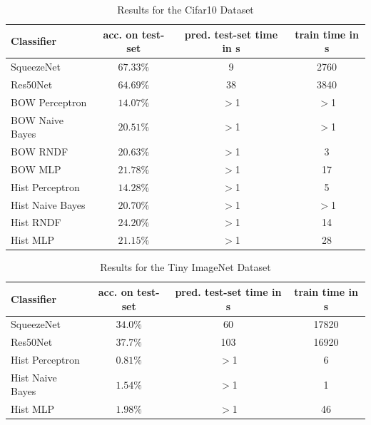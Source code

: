 \documentclass[11pt]{article}
\begin{document}
\begin{table}
	\centering
	\begin{tabular}{l|c|c|c}
	\toprule
		Classifier        & acc. on test-set  & pred. test-set time in s & train time in s\\
	\midrule
		SqueezeNet 		  & $67.33\%$         & 9 						 & 2760\\
		Res50Net   		  & $64.69\%$         & 38 						 & 3840\\
		BOW Perceptron    & $14.07\%$         & $>$1 					 & $>$1\\
		BOW Naive Bayes   & $20.51\%$         & $>$1 					 & $>$1\\
		BOW RNDF  		  & $20.63\%$         & $>$1 					 & 3   \\
		BOW MLP  		  & $21.78\%$         & $>$1 					 & 17  \\
		Hist Perceptron   & $14.28\%$         & $>$1 					 & 5   \\
		Hist Naive Bayes  & $20.70\%$         & $>$1 					 & $>$1\\
		Hist RNDF         & $24.20\%$         & $>$1 					 & 14  \\
		Hist MLP          & $21.15\%$         & $>$1 					 & 28  \\
	\bottomrule
	\end{tabular}
	\caption{Results for the Cifar10 Dataset}
\label{conc::1}
\end{table}


\begin{table}
	\centering
	\begin{tabular}{l|c|c|c}
	\toprule
		Classifier & acc. on test-set & pred. test-set time in s & train time in s\\
	\midrule
		SqueezeNet 		  & $34.0\%$           & 60 						 & 17820\\
		Res50Net   		  & $37.7\%$           & 103 					     & 16920\\
		Hist Perceptron   & $0.81\%$         & $>$1 					 & 6   \\
		Hist Naive Bayes  & $1.54\%$         & $>$1 					 & 1\\
		Hist MLP          & $1.98\%$         & $>$1 					 & 46  \\
	\bottomrule
	\end{tabular}
	\caption{Results for the Tiny ImageNet Dataset}
\label{conc::2}
\end{table}
\end{document}
